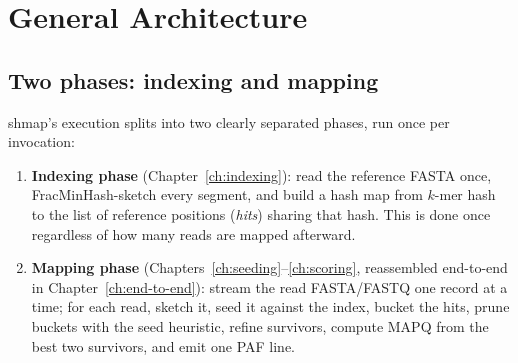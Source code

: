 \chapter{General Architecture}
\label{ch:architecture}

\section{Two phases: indexing and mapping}

shmap's execution splits into two clearly separated phases, run once per invocation:

\begin{enumerate}
  \item \textbf{Indexing phase} (Chapter~\ref{ch:indexing}): read the reference FASTA once,
    FracMinHash-sketch every segment, and build a hash map from $k$-mer hash to the list of
    reference positions (\emph{hits}) sharing that hash. This is done once regardless of how many
    reads are mapped afterward.
  \item \textbf{Mapping phase} (Chapters~\ref{ch:seeding}--\ref{ch:scoring},
    reassembled end-to-end in Chapter~\ref{ch:end-to-end}): stream the read FASTA/FASTQ one record
    at a time; for each read, sketch it, seed it against the index, bucket the hits, prune buckets
    with the seed heuristic, refine survivors, compute MAPQ from the best two survivors, and emit
    one PAF line.
\end{enumerate}

